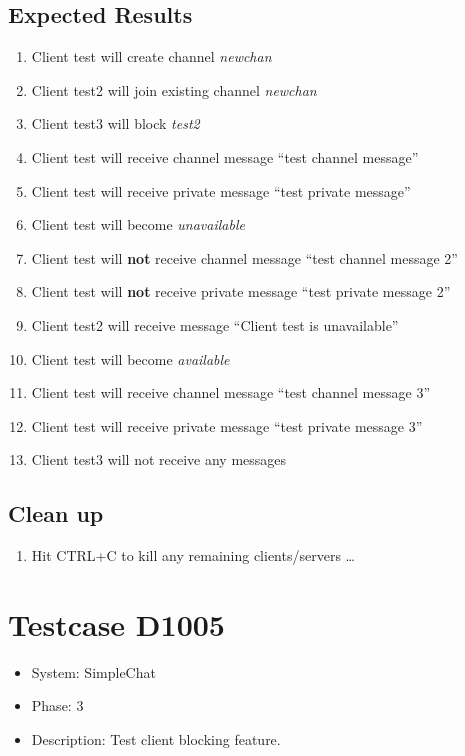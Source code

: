 \documentclass[12pt]{article}
\begin{document}
\subsection*{Expected Results}
\begin{enumerate}
\item Client test will create channel \emph{newchan}
\item Client test2 will join existing channel \emph{newchan}
\item Client test3 will block \emph{test2}
\item Client test will receive channel message ``test channel message''
\item Client test will receive private message ``test private message''
\item Client test will become \emph{unavailable}
\item Client test will \textbf{not} receive channel message ``test channel message 2''
\item Client test will \textbf{not} receive private message ``test private message 2''
\item Client test2 will receive message ``Client test is unavailable''
\item Client test will become \emph{available}
\item Client test will receive channel message ``test channel message 3''
\item Client test will receive private message ``test private message 3''
\item Client test3 will not receive any messages
\end{enumerate}

\subsection*{Clean up}
\begin{enumerate}
\item Hit CTRL+C to kill any remaining clients/servers \dots
\end{enumerate}

\section{Testcase D1005}
\begin{itemize}
\item System: SimpleChat
\item Phase: 3
\item Description: Test client blocking feature.
\end{itemize}
\end{document}

